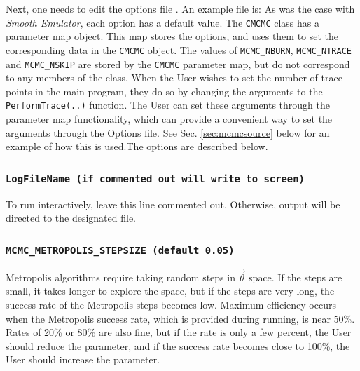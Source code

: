 \documentclass[UserManual.tex]{subfiles}
\begin{document}
Next, one needs to edit the options file 
. An example file is:
\vspace*{-8pt}{\tt
\begin{Verbatim}
 # This is for the MCMC search of parameter space
 # (not for the emulator tuning)
 #LogFileName smoothlog.txt # comment out for interactive running
 # If success rate approaches zero, reduce MCMC_METROPOLIS_STEPSIZE, if it approaches 1.0, increase it
 MCMC_METROPOLIS_STEPSIZE 0.06
 MCMC_IGNORE_EMULATOR_ERROR false
 MCMC_RANSEED  12345
 MCMC_NBURN 5
 MCMC_NSKIP 10000
 MCMC_NTRACE 100000
\end{Verbatim}
}\vspace*{-8pt}
As was the case with {\it Smooth Emulator}, each option has a default value. The {\tt CMCMC} class has a parameter map object. This map stores the options, and uses them to set the corresponding data in the {\tt CMCMC} object. The values of {\tt MCMC\_NBURN}, {\tt MCMC\_NTRACE} and {\tt MCMC\_NSKIP} are stored by the {\tt CMCMC} parameter map, but do not correspond to any members of the class. When the User wishes to set the number of trace points in the main program, they do so by changing the arguments to the {\tt PerformTrace(..)} function. The User can set these arguments through the parameter map functionality, which can provide a convenient way to set the arguments through the Options file. See Sec. \ref{sec:mcmcsource} below for an example of how this is used.The options are described below.
\subsubsection{{\tt LogFileName (if commented out will write to screen)}}
To run interactively, leave this line commented out. Otherwise, output will be directed to the designated file.
\subsubsection{{\tt MCMC\_METROPOLIS\_STEPSIZE (default 0.05)}}
Metropolis algorithms require taking random steps in $\vec{\theta}$ space. If the steps are small, it takes longer to explore the space, but if the steps are very long, the success rate of the Metropolis steps becomes low. Maximum efficiency occurs when the Metropolis success rate, which is provided during running, is near 50\%. Rates of 20\% or 80\% are also fine, but if the rate is only a few percent, the User should reduce the parameter, and if the success rate becomes close to 100\%, the User should increase the parameter.
\end{document}
